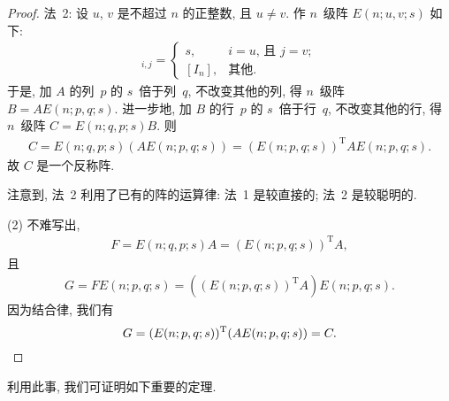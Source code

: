 \begin{proof}
    法~2:
    设 \(u\), \(v\) 是不超过 \(n\) 的正整数, 且 \(u \neq v\).
    作 \(n\)~级阵 \(E(n; u, v; s)\) 如下:
    \begin{align*}
        [E(n; u, v; s)]_{i,j}
        = \begin{cases}
              s,     & \text{\(i = u\), 且 \(j = v\)}; \\
              [I_n], & \text{其他}.
          \end{cases}
    \end{align*}
    于是, 加 \(A\) 的列~\(p\) 的 \(s\)~倍于列~\(q\),
    不改变其他的列, 得 \(n\)~级阵 \(B = A E(n; p, q; s)\).
    进一步地,
    加 \(B\) 的行~\(p\) 的 \(s\)~倍于行~\(q\),
    不改变其他的行, 得 \(n\)~级阵 \(C = E(n; q, p; s) B\).
    则
    \begin{align*}
        C = E(n; q, p; s) (A E(n; p, q; s))
        = (E(n; p, q; s))^{\mathrm{T}} A E(n; p, q; s).
    \end{align*}
    故 \(C\) 是一个反称阵.

    注意到, 法~2 利用了已有的阵的运算律:
    法~1 是较直接的; 法~2 是较聪明的.

    (2)
    不难写出,
    \begin{align*}
        F = E(n; q, p; s) A = (E(n; p, q; s))^{\mathrm{T}} A,
    \end{align*}
    且
    \begin{align*}
        G = F E(n; p, q; s)
        = ((E(n; p, q; s))^{\mathrm{T}} A) E(n; p, q; s).
    \end{align*}
    因为结合律, 我们有
    \begin{equation*}
        G
        = (E(n; p, q; s))^{\mathrm{T}} (A E(n; p, q; s))
        = C.
        \qedhere
    \end{equation*}
\end{proof}

利用此事, 我们可证明如下重要的定理.

